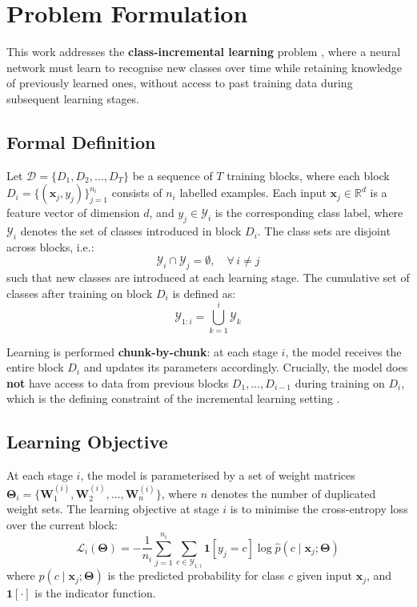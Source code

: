 \section{Problem Formulation}
\label{sec:problem_formulation}

This work addresses the \textbf{class-incremental learning} problem 
\cite{de2021continual, van2019three}, where a neural network must learn to recognise 
new classes over time while retaining knowledge of previously learned ones, without 
access to past training data during subsequent learning stages.

\subsection*{Formal Definition}

Let $\mathcal{D} = \{D_1, D_2, \ldots, D_T\}$ be a sequence of $T$ training blocks, 
where each block $D_i = \{(\mathbf{x}_j, y_j)\}_{j=1}^{n_i}$ consists of $n_i$ 
labelled examples. Each input $\mathbf{x}_j \in \mathbb{R}^d$ is a feature vector 
of dimension $d$, and $y_j \in \mathcal{Y}_i$ is the corresponding class label, 
where $\mathcal{Y}_i$ denotes the set of classes introduced in block $D_i$. The 
class sets are disjoint across blocks, i.e.:
\[
\mathcal{Y}_i \cap \mathcal{Y}_j = \emptyset, \quad \forall\, i \neq j
\]
such that new classes are introduced at each learning stage. The cumulative set of 
classes after training on block $D_i$ is defined as:
\[
\mathcal{Y}_{1:i} = \bigcup_{k=1}^{i} \mathcal{Y}_k
\]

Learning is performed \textbf{chunk-by-chunk}: at each stage $i$, the model receives 
the entire block $D_i$ and updates its parameters accordingly. Crucially, the model 
does \textbf{not} have access to data from previous blocks $D_1, \ldots, D_{i-1}$ 
during training on $D_i$, which is the defining constraint of the incremental 
learning setting \cite{de2021continual, rebuffi2017icarl}.

\subsection*{Learning Objective}

At each stage $i$, the model is parameterised by a set of weight matrices 
$\boldsymbol{\Theta}_i = \{\mathbf{W}_1^{(i)}, \mathbf{W}_2^{(i)}, \ldots, 
\mathbf{W}_n^{(i)}\}$, where $n$ denotes the number of duplicated weight sets. 
The learning objective at stage $i$ is to minimise the cross-entropy loss over 
the current block:
\[
\mathcal{L}_i(\boldsymbol{\Theta}) = -\frac{1}{n_i} \sum_{j=1}^{n_i} 
\sum_{c \in \mathcal{Y}_{1:i}} \mathbf{1}[y_j = c] \log \hat{p}(c \mid 
\mathbf{x}_j; \boldsymbol{\Theta})
\]
where $\hat{p}(c \mid \mathbf{x}_j; \boldsymbol{\Theta})$ is the predicted 
probability for class $c$ given input $\mathbf{x}_j$, and $\mathbf{1}[\cdot]$ 
is the indicator function.

